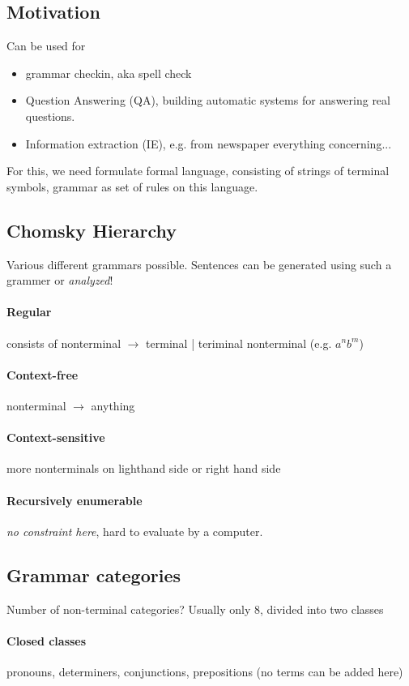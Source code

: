 \documentclass[11pt]{article}
\begin{document}
\subsection{Motivation}
Can be used for 
\begin{itemize}
	\item grammar checkin, aka spell check
	\item Question Answering (QA), building automatic systems for answering real questions.
	\item Information extraction (IE), e.g. from newspaper everything concerning...
\end{itemize} 
For this, we need formulate formal language, consisting of strings of terminal symbols,
grammar as set of rules on this language.

\subsection{Chomsky Hierarchy}
Various different grammars possible. Sentences can be generated using such a grammer or \emph{analyzed}!

\paragraph{Regular} consists of nonterminal $\rightarrow$ terminal | teriminal nonterminal (e.g. $a^nb^m$)
\paragraph{Context-free} nonterminal $\rightarrow$ anything
\paragraph{Context-sensitive} more nonterminals on lighthand side or right hand side
\paragraph{Recursively enumerable} \emph{no constraint here}, hard to evaluate by a computer.

\subsection{Grammar categories}
Number of non-terminal categories? Usually only 8, divided into two classes
\paragraph{Closed classes} pronouns, determiners, conjunctions, prepositions (no terms can
be added here)
\end{document}

